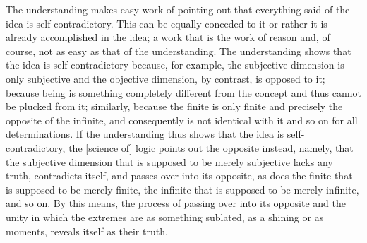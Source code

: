     The understanding makes easy work of pointing out that everything
    said of the idea is self-contradictory.
    This can be equally conceded to it or rather it is already accomplished
    in the idea; a work that is the work of reason and, of course,
    not as easy as that of the understanding.
    The understanding shows that the idea is self-contradictory because,
    for example, the subjective dimension is only subjective
    and the objective dimension, by contrast, is opposed to it;
    because being is something completely different from
    the concept and thus cannot be plucked from it;
    similarly, because the finite is only finite and
    precisely the opposite of the infinite, and
    consequently is not identical with it and so on for all determinations.
    If the understanding thus shows that the idea is self-contradictory,
    the [science of] logic points out the opposite instead, namely,
    that the subjective dimension that is supposed to be merely subjective
    lacks any truth, contradicts itself, and passes over into its opposite,
    as does the finite that is supposed to be merely finite,
    the infinite that is supposed to be merely infinite, and so on.
    By this means, the process of passing over into its opposite and the
    unity in which the extremes are as something sublated, as a shining
    or as moments, reveals itself as their truth.

